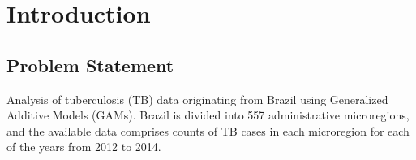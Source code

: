 \section{Introduction}

\subsection*{Problem Statement}
Analysis of tuberculosis (TB) data originating from Brazil using Generalized Additive Models (GAMs). Brazil is divided into 557 administrative microregions, and the available data
comprises counts of TB cases in each microregion for each of the years from 2012 to 2014.